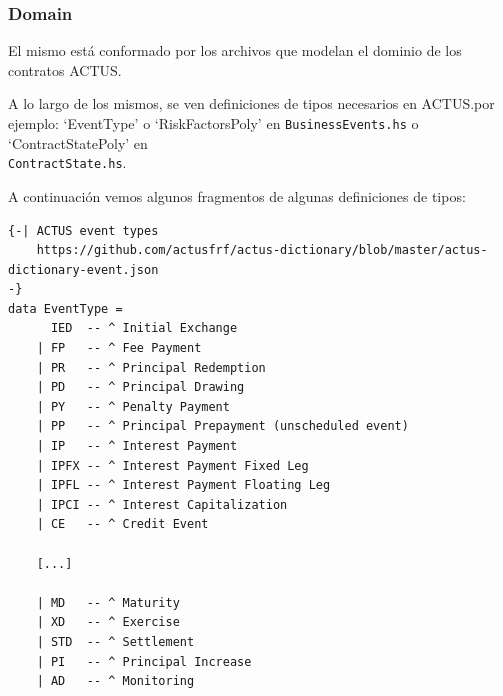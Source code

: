 \documentclass[12pt]{book}
\begin{document}
\subsubsection{Domain}

El mismo está conformado por los archivos que modelan el dominio de los contratos ACTUS.\@


A lo largo de los mismos, se ven definiciones de tipos necesarios en ACTUS.\@Como por ejemplo: `EventType' o `RiskFactorsPoly' en \texttt{BusinessEvents.hs} o `ContractStatePoly' en\\ \texttt{ContractState.hs}.

A continuación vemos algunos fragmentos de algunas definiciones de tipos:

\begin{lstlisting}[style=Haskell-cardano, caption=Algunos tipos de eventos.]
{-| ACTUS event types
    https://github.com/actusfrf/actus-dictionary/blob/master/actus-dictionary-event.json
-}
data EventType =
      IED  -- ^ Initial Exchange
    | FP   -- ^ Fee Payment
    | PR   -- ^ Principal Redemption
    | PD   -- ^ Principal Drawing
    | PY   -- ^ Penalty Payment
    | PP   -- ^ Principal Prepayment (unscheduled event)
    | IP   -- ^ Interest Payment
    | IPFX -- ^ Interest Payment Fixed Leg
    | IPFL -- ^ Interest Payment Floating Leg
    | IPCI -- ^ Interest Capitalization
    | CE   -- ^ Credit Event

    [...]

    | MD   -- ^ Maturity
    | XD   -- ^ Exercise
    | STD  -- ^ Settlement
    | PI   -- ^ Principal Increase
    | AD   -- ^ Monitoring
\end{lstlisting}
\end{document}
